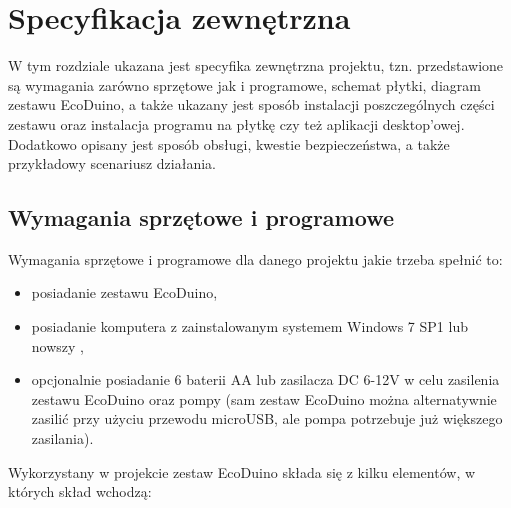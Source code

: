 \documentclass[a4paper,twoside,12pt]{book}
\begin{document}
\begin{itemize}
\end{itemize}

\chapter{Specyfikacja zewnętrzna}

W tym rozdziale ukazana jest specyfika zewnętrzna projektu, tzn. przedstawione są wymagania zarówno sprzętowe jak i programowe, schemat płytki, diagram zestawu EcoDuino, a także ukazany jest sposób instalacji poszczególnych części zestawu oraz instalacja programu na płytkę czy też aplikacji desktop'owej. Dodatkowo opisany jest sposób obsługi, kwestie bezpieczeństwa, a także przykładowy scenariusz działania.

\section{Wymagania sprzętowe i programowe}

Wymagania sprzętowe i programowe dla danego projektu jakie trzeba spełnić to:

\begin{itemize}
   \item posiadanie zestawu EcoDuino,
   \item posiadanie komputera z zainstalowanym systemem Windows 7 SP1 lub nowszy \cite{bib:url001},
   \item opcjonalnie posiadanie 6 baterii AA lub zasilacza DC 6-12V w celu zasilenia zestawu EcoDuino oraz pompy (sam zestaw EcoDuino można alternatywnie zasilić przy użyciu przewodu microUSB, ale pompa potrzebuje już większego zasilania).
\end{itemize}

Wykorzystany w projekcie zestaw EcoDuino składa się z kilku elementów, w których skład wchodzą:
\end{document}
